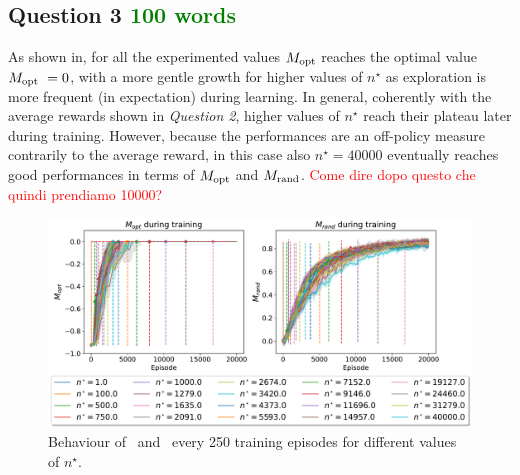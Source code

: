 \documentclass[10pt]{IEEEtran}
\begin{document}
\subsection*{Question 3  \textcolor{green}{100 words}}
As shown in, for all the experimented values $M_{\text{opt}}$ reaches the optimal value $M_{\text{opt}} \ = 0$, with a more gentle growth for higher values of $n^{\star}$ as exploration is more frequent (in expectation) during learning. In general, coherently with the average rewards shown in \emph{Question 2}, higher values of $n^{\star}$ reach their plateau later during training. However, because the performances are an off-policy measure contrarily to the average reward, in this case also $n^{\star} = 40000$ eventually reaches good performances in terms of $M_{\text{opt}}$ and $M_{\text{rand}}$.
\textcolor{red}{Come dire dopo questo che quindi prendiamo 10000?}
\begin{figure}[h]
    \centering
    \includegraphics[width=\linewidth]{code/figures/performance_n_star.pdf}
    \caption{Behaviour of \mopt\  and \mrand\  every 250 training episodes for different values of $n^{\star}$.}
    \label{plot_question3}
\end{figure}
\end{document}
